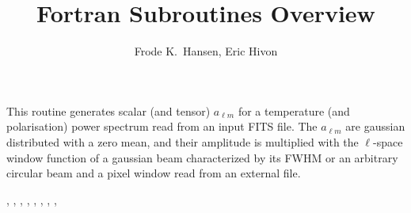 
\sloppy


\title{\healpix Fortran Subroutines Overview}
 \section[create\_alm*]{ }
\label{sub:create_alm}
\author{Frode K.~Hansen, Eric Hivon}

\begin{facility}
{This routine generates scalar (and tensor) $a_{\ell m}$ for a temperature (and
  polarisation) power spectrum read from an input FITS
file. The $a_{\ell m}$ are gaussian distributed with a zero mean, and their
  amplitude is multiplied with the $\ell$-space window function of a gaussian
  beam characterized by its FWHM or an arbitrary circular beam
and a pixel window read from an external file.}
{\modAlmTools}
\end{facility}

\begin{f90format}
{%
, %
, %
, %
, %
, %
, %
, %
, %
 }
\end{f90format}
\aboutoptional

